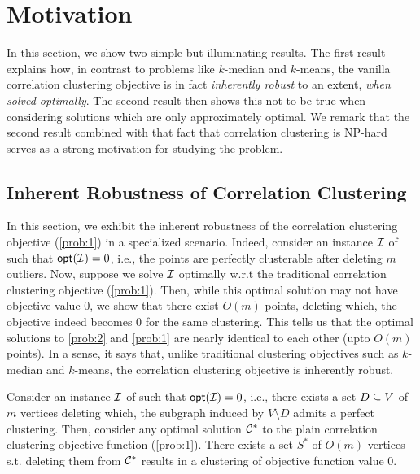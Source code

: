 \section{Motivation}

In this section, we show two simple but illuminating results. The first result explains how, in contrast to problems like $k$-median and $k$-means, the vanilla correlation clustering objective is in fact \emph{inherently robust} to an extent, \emph{when solved optimally}. The second result then shows this not to be true when considering solutions which are only approximately optimal. We remark that the second result combined with that fact that correlation clustering is NP-hard \cite{XXX} serves as a strong motivation for studying the \robcc problem.

\subsection{Inherent Robustness of Correlation Clustering}
In this section, we exhibit the inherent robustness of the correlation clustering objective (\ref{prob:1}) in a specialized scenario. Indeed, consider an instance ${\cal I}$ of \robcc such that $\mathsf{opt}({\cal I}) = 0$, i.e., the points are perfectly clusterable after deleting $m$ outliers. Now, suppose we solve ${\cal I}$ optimally w.r.t the traditional correlation clustering objective (\ref{prob:1}). Then, while this optimal solution may not have objective value $0$, we show that there exist $O(m)$ points, deleting which, the objective indeed becomes $0$ for the same clustering. This tells us that the optimal solutions to \ref{prob:2} and \ref{prob:1} are nearly identical to each other (upto $O(m)$ points). In a sense, it says that, unlike traditional clustering objectives such as $k$-median and $k$-means, the correlation clustering objective is inherently robust.

\begin{theorem}\label{theorem:17}
Consider an instance ${\cal I}$ of \robcc such that $\mathsf{opt}({\cal I}) = 0$, i.e., there exists a set $D \subseteq V$ of $m$ vertices deleting which, the subgraph induced by $V \setminus D$ admits a perfect clustering. Then, consider any optimal solution ${\cal C}^*$ to the  plain correlation clustering objective function (\ref{prob:1}). There exists a set $S^*$ of $O(m)$ vertices s.t. deleting them from ${\cal C}^*$ results in a clustering of objective function value $0$.
\end{theorem}

